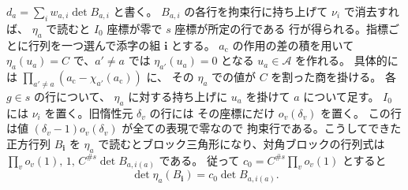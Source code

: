 \(d_a=\sum_i w_{a,i}\det B_{a,i}\) と書く。
\(B_{a,i}\) の各行を拘束行に持ち上げて \(\nu_i\) で消去すれば、
\(\eta_a\) で読むと \(I_0\) 座標が零で \(s\) 座標が所定の行である
行が得られる。指標ごとに行列を一つ選んで添字の組 \(\mathbf i\) とする。
\(a_{\mathrm c}\) の作用の差の積を用いて
\(\eta_a(u_a)=C\) で、\(a'\ne a\) では \(\eta_{a'}(u_a)=0\) となる
\(u_a\in\mathcal A\) を作れる。
具体的には \(\prod_{a'\ne a}(a_{\mathrm c}-\chi_{a'}(a_{\mathrm c}))\) に、
その \(\eta_a\) での値が \(C\) を割った商を掛ける。
各 \(g\in s\) の行について、
\(\eta_a\) に対する持ち上げに \(u_a\) を掛けて \(a\) について足す。
\(I_0\) には \(\nu_i\) を置く。旧惰性元 \(\delta_v\) の行には
その座標にだけ \(o_v(\delta_v)\) を置く。
この行は値 \((\delta_v-1)o_v(\delta_v)\) が全ての表現で零なので
拘束行である。こうしてできた正方行列 \(B_{\mathbf i}\) を
\(\eta_a\) で読むとブロック三角形になり、対角ブロックの行列式は
\(\prod_v o_v(1),\,1,\,C^{\#s}\det B_{a,i(a)}\) である。
従って \(c_0=C^{\#s}\prod_v o_v(1)\) とすると
\[
 \det\eta_a(B_{\mathbf i})=c_0\det B_{a,i(a)}.
\]

